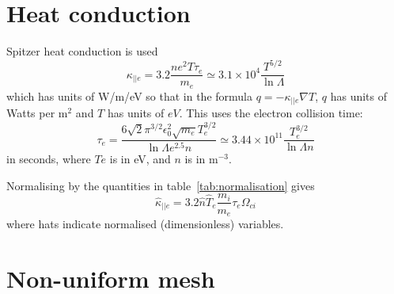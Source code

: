 \documentclass[12pt,a4paper]{article}
\begin{document}
\section{Heat conduction}
\label{sec:heatconduction}

Spitzer heat conduction is used
\begin{equation}
\kappa_{||e} = 3.2\frac{ne^2T\tau_e}{m_e} \simeq 3.1\times 10^4 \frac{T^{5/2}}{\ln \Lambda}
\end{equation}
which has units of W/m/eV so that in the formula $q = -\kappa_{||e} \nabla T$, $q$ has units of Watts per m$^2$ and $T$ has units of
$eV$. This uses the electron collision time:
\begin{equation}
\tau_e = \frac{6\sqrt{2}\pi^{3/2}\epsilon_0^2\sqrt{m_e}T_e^{3/2}}{\ln \Lambda e^{2.5} n} \simeq 3.44\times 10^{11} \frac{T_e^{3/2}}{\ln \Lambda n}
\end{equation}
in seconds, where $Te$ is in eV, and $n$ is in m$^{-3}$.

Normalising by the quantities in table~\ref{tab:normalisation} gives
\begin{equation}
\hat{\kappa}_{||e} = 3.2 \hat{n}\hat{T}_e\frac{m_i}{m_e}\tau_e\Omega_{ci}
\end{equation}
where hats indicate normalised (dimensionless) variables. 

\section{Non-uniform mesh}
\end{document}

